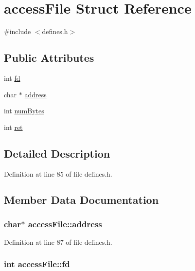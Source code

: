 \hypertarget{structaccess_file}{\section{access\-File Struct Reference}
\label{structaccess_file}
}


{\ttfamily \#include $<$defines.\-h$>$}

\subsection*{Public Attributes}
\begin{DoxyCompactItemize}
\item 
int \hyperlink{structaccess_file_a9ab395b069b2bd43673532852db9fc08}{fd}
\item 
char $\ast$ \hyperlink{structaccess_file_a8703e8c02cbe832f83766a84ec60679e}{address}
\item 
int \hyperlink{structaccess_file_a88da95f58ee0db9eff5d9fae8d94585f}{num\-Bytes}
\item 
int \hyperlink{structaccess_file_af78cfca94c3c5287dd6b843953eb1052}{ret}
\end{DoxyCompactItemize}


\subsection{Detailed Description}


Definition at line 85 of file defines.\-h.



\subsection{Member Data Documentation}
\hypertarget{structaccess_file_a8703e8c02cbe832f83766a84ec60679e}{
\subsubsection[{address}]{\setlength{\rightskip}{0pt plus 5cm}char$\ast$ access\-File\-::address}}\label{structaccess_file_a8703e8c02cbe832f83766a84ec60679e}


Definition at line 87 of file defines.\-h.

\hypertarget{structaccess_file_a9ab395b069b2bd43673532852db9fc08}{
\subsubsection[{fd}]{\setlength{\rightskip}{0pt plus 5cm}int access\-File\-::fd}}\label{structaccess_file_a9ab395b069b2bd43673532852db9fc08}


